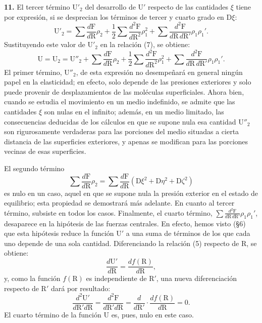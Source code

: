 \noindent\textbf{11.} El tercer término $\mathrm{U}'_2$ del desarrollo de
$\mathrm{U}'$ respecto de las cantidades $\xi$ tiene por expresión, si se
desprecian los términos de tercer y cuarto grado en $\mathrm{D}\xi$:
\begin{equation}
\mathrm{U}'_2=\sum\frac{d\mathrm{F}}{d\mathrm{R}}\rho_2
+\frac12\sum\frac{d^2\mathrm{F}}{d\mathrm{R}^2}\rho_1^2
+\sum\frac{d^2\mathrm{F}}{d\mathrm{R}\,d\mathrm{R}'}\rho_1\rho_1'.
\tag{15}
\end{equation}
Sustituyendo este valor de $\mathrm{U}'_2$ en la relación (7), se obtiene:
\[
\mathrm{U}=\mathrm{U}_2=\mathrm{U}''_2+\sum\frac{d\mathrm{F}}{d\mathrm{R}}\rho_2
+\frac12\sum\frac{d^2\mathrm{F}}{d\mathrm{R}^2}\rho_1^2
+\sum\frac{d^2\mathrm{F}}{d\mathrm{R}\,d\mathrm{R}'}\rho_1\rho_1'.
\]
El primer término, $\mathrm{U}''_2$, de esta expresión no desempeñará en
general ningún papel en la elasticidad; en efecto, solo depende de las
presiones exteriores y solo puede provenir de desplazamientos de las
moléculas superficiales. Ahora bien, cuando se estudia el movimiento en un
medio indefinido, se admite que las cantidades $\xi$ son nulas en el
infinito; además, en un medio limitado, las consecuencias deducidas de los
cálculos en que se supone nula esa cantidad $\mathrm{U}''_2$ son
rigurosamente verdaderas para las porciones del medio situadas a cierta
distancia de las superficies exteriores, y apenas se modifican para las
porciones vecinas de esas superficies.

El segundo término
\[
\sum\frac{d\mathrm{F}}{d\mathrm{R}}\rho_2
=\sum\frac{d\mathrm{F}}{d\mathrm{R}}(\mathrm{D}\xi^2+\mathrm{D}\eta^2+\mathrm{D}\zeta^2)
\]
es nulo en un caso, aquel en que se supone nula la
presión exterior en el estado de equilibrio; esta propiedad se demostrará
más adelante. En cuanto al tercer término, subsiste en todos los casos.
Finalmente, el cuarto término, $\displaystyle\sum\frac{d^2\mathrm{F}}{d\mathrm{R}\,d\mathrm{R}'}\rho_1\rho_1'$,
desaparece en la hipótesis de las fuerzas centrales. En efecto, hemos visto
(§6) que esta hipótesis reduce la función $\mathrm{U}'$ a una suma de
términos de los que cada uno depende de una sola cantidad. Diferenciando la
relación (5) respecto de $\mathrm{R}$, se obtiene:
\[
\frac{d\mathrm{U}'}{d\mathrm{R}}=\frac{df(\mathrm{R})}{d\mathrm{R}},
\]
y, como la función $f(\mathrm{R})$ es independiente de $\mathrm{R}'$, una
nueva diferenciación respecto de $\mathrm{R}'$ dará por resultado:
\[
\frac{d^2\mathrm{U}'}{d\mathrm{R}'d\mathrm{R}}=\frac{d^2\mathrm{F}}{d\mathrm{R}'d\mathrm{R}}
=\frac{d}{d\mathrm{R}'}\cdot\frac{df(\mathrm{R})}{d\mathrm{R}}=0.
\]
El cuarto término de la función $\mathrm{U}$ es, pues, nulo en este caso.

